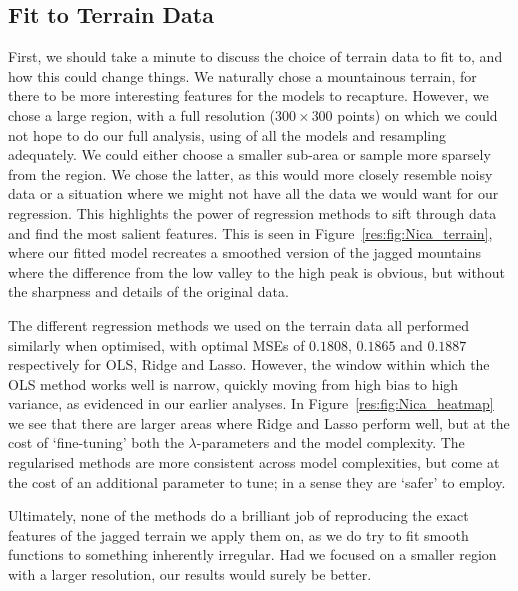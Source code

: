 \documentclass[twocolumn,english,notitlepage]{article}
\begin{document}
    \subsection{Fit to Terrain Data}
        First, we should take a minute to discuss the choice of terrain data to fit to, and how this could change things. We naturally chose a mountainous terrain, for there to be more interesting features for the models to recapture. However, we chose a large region, with a full resolution ($300\times 300$ points) on which we could not hope to do our full analysis, using of all the models and resampling adequately. We could either choose a smaller sub-area or sample more sparsely from the region. We chose the latter, as this would more closely resemble noisy data or a situation where we might not have all the data we would want for our regression. This highlights the power of regression methods to sift through data and find the most salient features. This is seen in Figure~\ref{res:fig:Nica_terrain}, where our fitted model recreates a smoothed version of the jagged mountains where the difference from the low valley to the high peak is obvious, but without the sharpness and details of the original data.

        The different regression methods we used on the terrain data all performed similarly when optimised, with optimal MSEs of $0.1808$, $0.1865$ and $0.1887$ respectively for OLS, Ridge and Lasso. However, the window within which the OLS method works well is narrow, quickly moving from high bias to high variance, as evidenced in our earlier analyses. In Figure~\ref{res:fig:Nica_heatmap} we see that there are larger areas where Ridge and Lasso perform well, but at the cost of `fine-tuning' both the $\lambda$-parameters and the model complexity. The regularised methods are more consistent across model complexities, but come at the cost of an additional parameter to tune; in a sense they are `safer' to employ.

        Ultimately, none of the methods do a brilliant job of reproducing the exact features of the jagged terrain we apply them on, as we do try to fit smooth functions to something inherently irregular. Had we focused on a smaller region with a larger resolution, our results would surely be better.
\end{document}
